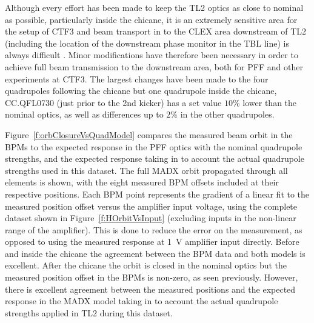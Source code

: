 
Although every effort has been made to keep the TL2 optics as close to nominal as possible, particularly inside the chicane, it is an extremely sensitive area for the setup of CTF3 and beam transport in to the CLEX area downstream of TL2 (including the location of the downstream phase monitor in the TBL line) is always difficult \cite{piotrPriv}. Minor modifications have therefore been necessary in order to achieve full beam transmission to the downstream area, both for PFF and other experiments at CTF3. The largest changes have been made to the four quadrupoles following the chicane but one quadrupole inside the chicane, CC.QFL0730 (just prior to the 2nd kicker) has a set value \(10\%\) lower than the nominal optics, as well as differences up to \(2\%\) in the other quadrupoles. 

Figure~\ref{f:orbClosureVsQuadModel} compares the measured beam orbit
 in the BPMs to the expected response in the PFF optics with the 
 nominal quadrupole strengths, and the expected response taking in to
 account the actual quadrupole strengths used in this dataset.
 The full MADX orbit propagated through all elements is shown, with the eight measured BPM offsets included at their respective positions. 
 Each BPM point represents the gradient of a linear fit to the measured position offset versus the amplifier input voltage, using the complete dataset shown in Figure~\ref{f:HOrbitVsInput} (excluding inputs in the non-linear range of the amplifier). This is done to reduce the error on the measurement, as opposed to using the measured response at 1~V amplifier input directly.
 Before and inside the chicane the agreement between the BPM data and both models is excellent.
  After the chicane the orbit is closed in the nominal optics but the 
  measured position offset in the BPMs is non-zero, as seen previously.
  However, there is excellent agreement between the measured positions
  and the expected response in the MADX model taking in to account the 
  actual quadrupole strengths applied in TL2 during this dataset.

